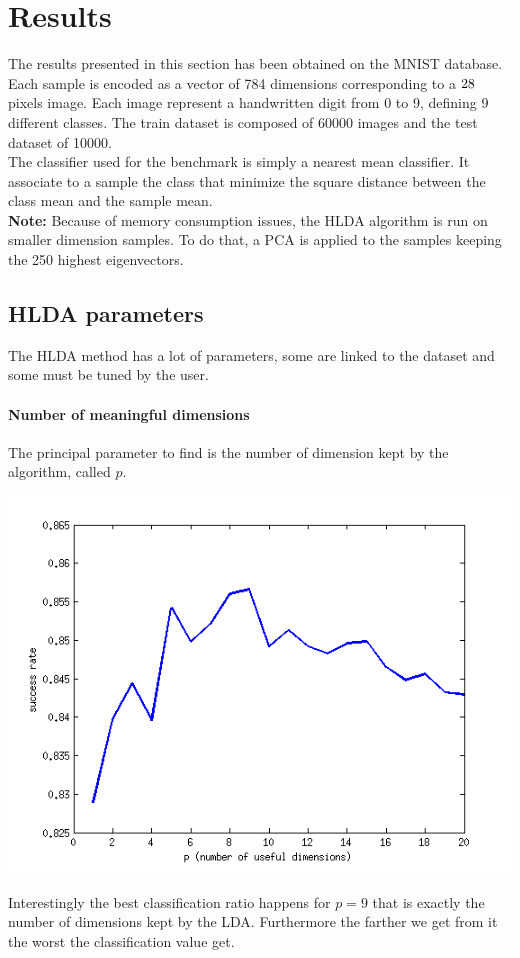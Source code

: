 
\section{Results}
\label{sec:results}

The results presented in this section has been obtained on the MNIST database.
Each sample is encoded as a vector of 784 dimensions corresponding to a $28 \time 28$
pixels image. Each image represent a handwritten digit from 0 to 9, defining 9 different
classes.
The train dataset is composed of 60000 images and the test dataset of 10000.\\

The classifier used for the benchmark is simply a nearest mean classifier.
It associate to a sample the class that minimize the square distance between the class mean and
the sample mean.\\

{\bf Note:} Because of memory consumption issues, the HLDA algorithm is
run on smaller dimension samples. To do that, a PCA is applied to the samples keeping the
250 highest eigenvectors.

\subsection{HLDA parameters}

The HLDA method has a lot of parameters, some are linked to the dataset and some must be tuned
by the user.

\paragraph{Number of meaningful dimensions} The principal parameter to find is the number of dimension kept
by the algorithm, called $p$.

\begin{center}
  \includegraphics[scale=0.75]{img/bench-classes}
\end{center}

Interestingly the best classification ratio happens for $p = 9$ that
is exactly the number of dimensions kept by the LDA. Furthermore the farther we get from
it the worst the classification value get.

